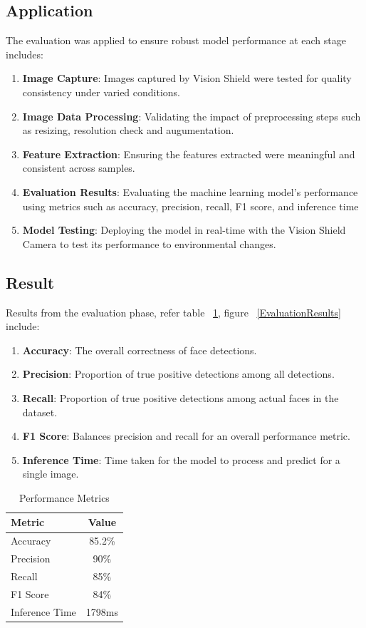\subsection{Application}
The evaluation was applied to ensure robust model performance at each stage includes:
\begin{enumerate}
	\item \textbf{Image Capture}: Images captured by Vision Shield were tested for quality consistency under varied conditions.
	\item \textbf{Image Data Processing}: Validating the impact of preprocessing steps such as resizing, resolution check and augumentation.
	\item \textbf{Feature Extraction}: Ensuring the features extracted were meaningful and consistent across samples.
	\item \textbf{Evaluation Results}: Evaluating the machine learning model's performance using metrics such as accuracy, precision, recall, F1 score, and inference time
	\item \textbf{Model Testing}: Deploying the model in real-time with the Vision Shield Camera to test its performance to environmental changes.
\end{enumerate}

\subsection{Result}
Results from the evaluation phase, refer table ~\ref{tab:metrics}, figure ~\ref{EvaluationResults} include:
\begin{enumerate}
	\item \textbf{Accuracy}: The overall correctness of face detections.
	\item \textbf{Precision}: Proportion of true positive detections among all detections.
	\item \textbf{Recall}: Proportion of true positive detections among actual faces in the dataset.
	\item \textbf{F1 Score}: Balances precision and recall for an overall performance metric.
	\item \textbf{Inference Time}: Time taken for the model to process and predict for a single image.
\end{enumerate}

\begin{table}[h!]
	\centering
	\begin{tabular}{|l|c|}
		\hline
		\textbf{Metric}        & \textbf{Value} \\ \hline
		Accuracy               & 85.2\%         \\ \hline
		Precision              & 90\%           \\ \hline
		Recall                 & 85\%           \\ \hline
		F1 Score               & 84\%           \\ \hline
		Inference Time         & 1798ms         \\ \hline
	\end{tabular}
	\caption{Performance Metrics}
	\label{tab:metrics}
\end{table}

